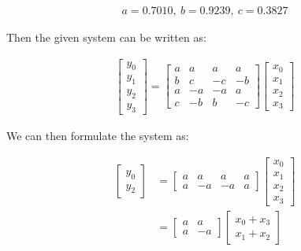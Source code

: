 \documentclass{article}
\begin{document}
\begin{align*}
    a = 0.7010, \ b = 0.9239, \ c = 0.3827
\end{align*}

Then the given system can be written as:

\begin{align*}
    \begin{bmatrix}
        y_0 \\
        y_1 \\
        y_2 \\
        y_3
    \end{bmatrix} 
    = 
    \begin{bmatrix}
        a & a & a & a \\
        b & c & -c & -b \\
        a & -a & -a & a \\
        c & -b & b & -c
    \end{bmatrix}
    \begin{bmatrix}
        x_0 \\
        x_1 \\
        x_2 \\
        x_3
    \end{bmatrix}
\end{align*}

We can then formulate the system as:

\begin{align*}
    \begin{bmatrix}
        y_0 \\
        y_2 
    \end{bmatrix} 
    &= \begin{bmatrix}
        a & a & a & a \\
        a & -a & -a & a 
    \end{bmatrix}
    \begin{bmatrix}
        x_0 \\
        x_1 \\
        x_2 \\
        x_3
    \end{bmatrix} \\
    &= \begin{bmatrix}
        a & a \\
        a & -a
    \end{bmatrix}
    \begin{bmatrix}
        x_0 + x_3 \\
        x_1 + x_2
    \end{bmatrix}
\end{align*}
\end{document}
